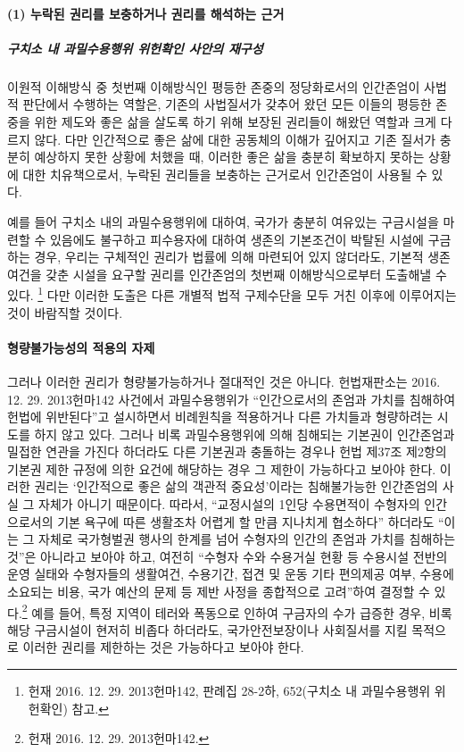 \paragraph{\texorpdfstring{ (1) 누락된 권리를 보충하거나 권리를 해석하는 근거}{ (1) 누락된 권리를 보충하거나 권리를 해석하는 근거}}

\subparagraph{구치소 내 과밀수용행위 위헌확인 사안의 재구성}

이원적 이해방식 중 첫번째 이해방식인 평등한 존중의 정당화로서의 인간존엄이 사법적 판단에서 수행하는 역할은, 기존의 사법질서가 갖추어 왔던 모든 이들의 평등한 존중을 위한 제도와 좋은 삶을 살도록 하기 위해 보장된 권리들이 해왔던 역할과 크게 다르지 않다. 다만 인간적으로 좋은 삶에 대한 공동체의 이해가 깊어지고 기존 질서가 충분히 예상하지 못한 상황에 처했을 때, 이러한 좋은 삶을 충분히 확보하지 못하는 상황에 대한 치유책으로서, 누락된 권리들을 보충하는 근거로서 인간존엄이 사용될 수 있다.

예를 들어 구치소 내의 과밀수용행위에 대하여, 국가가 충분히 여유있는 구금시설을 마련할 수 있음에도 불구하고 피수용자에 대하여 생존의 기본조건이 박탈된 시설에 구금하는 경우, 우리는 구체적인 권리가 법률에 의해 마련되어 있지 않더라도, 기본적 생존여건을 갖춘 시설을 요구할 권리를 인간존엄의 첫번째 이해방식으로부터 도출해낼 수 있다. \footnote{헌재 2016. 12. 29. 2013헌마142, 판례집 28-2하, 652(구치소 내 과밀수용행위 위헌확인) 참고.} 다만 이러한 도출은 다른 개별적 법적 구제수단을 모두 거친 이후에 이루어지는 것이 바람직할 것이다.

\paragraph{형량불가능성의 적용의 자제}

그러나 이러한 권리가 형량불가능하거나 절대적인 것은 아니다. 헌법재판소는 2016. 12. 29. 2013헌마142 사건에서 과밀수용행위가 ``인간으로서의 존엄과 가치를 침해하여 헌법에 위반된다''고 설시하면서 비례원칙을 적용하거나 다른 가치들과 형량하려는 시도를 하지 않고 있다. 그러나 비록 과밀수용행위에 의해 침해되는 기본권이 인간존엄과 밀접한 연관을 가진다 하더라도 다른 기본권과 충돌하는 경우나 헌법 제37조 제2항의 기본권 제한 규정에 의한 요건에 해당하는 경우 그 제한이 가능하다고 보아야 한다. 이러한 권리는 `인간적으로 좋은 삶의 객관적 중요성'이라는 침해불가능한 인간존엄의 사실 그 자체가 아니기 때문이다. 따라서, ``교정시설의 1인당 수용면적이 수형자의 인간으로서의 기본 욕구에 따른 생활조차 어렵게 할 만큼 지나치게 협소하다'' 하더라도 ``이는 그 자체로 국가형벌권 행사의 한계를 넘어 수형자의 인간의 존엄과 가치를 침해하는 것''은 아니라고 보아야 하고, 여전히 ``수형자 수와 수용거실 현황 등 수용시설 전반의 운영 실태와 수형자들의 생활여건, 수용기간, 접견 및 운동 기타 편의제공 여부, 수용에 소요되는 비용, 국가 예산의 문제 등 제반 사정을 종합적으로 고려''하여 결정할 수 있다.\footnote{헌재 2016. 12. 29. 2013헌마142.} 예를 들어, 특정 지역이 테러와 폭동으로 인하여 구금자의 수가 급증한 경우, 비록 해당 구금시설이 현저히 비좁다 하더라도, 국가안전보장이나 사회질서를 지킬 목적으로 이러한 권리를 제한하는 것은 가능하다고 보아야 한다.

